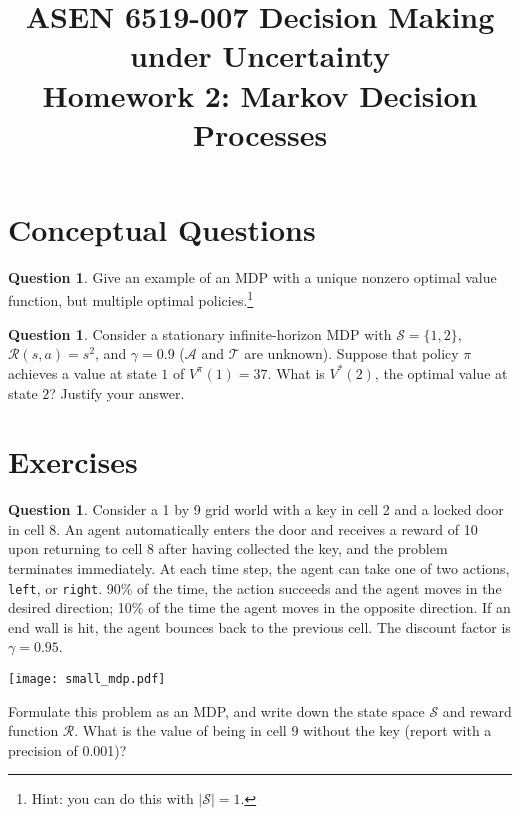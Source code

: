 \documentclass{article}
\title{ASEN 6519-007 Decision Making under Uncertainty\\
       Homework 2: Markov Decision Processes}
\theoremstyle{definition}
\newtheorem{question}[thm]{Question}
\begin{document}
\maketitle

\section{Conceptual Questions}

\begin{question}
    Give an example of an MDP with a unique nonzero optimal value function, but multiple optimal policies.\footnote{Hint: you can do this with $|\mathcal{S}| = 1$.}
\end{question}

\begin{question}
    Consider a stationary infinite-horizon MDP with $\mathcal{S} = \{1,2\}$, $\mathcal{R}(s, a) = s^2$, and $\gamma = 0.9$ ($\mathcal{A}$ and $\mathcal{T}$ are unknown). Suppose that policy $\pi$ achieves a value at state $1$ of $V^\pi(1) = 37$. What is $V^*(2)$, the optimal value at state $2$? Justify your answer.
\end{question}

\section{Exercises}

\begin{question}
    Consider a 1 by 9 grid world with a key in cell 2 and a locked door in cell 8. An agent automatically enters the door and receives a reward of 10 upon returning to cell 8 after having collected the key, and the problem terminates immediately. At each time step, the agent can take one of two actions, \texttt{left}, or \texttt{right}. 90\% of the time, the action succeeds and the agent moves in the desired direction; 10\% of the time the agent moves in the opposite direction. If an end wall is hit, the agent bounces back to the previous cell. The discount factor is $\gamma=0.95$.
\begin{center}
    \texttt{[image: small\_mdp.pdf]}
\end{center}

    Formulate this problem as an MDP, and write down the state space $\mathcal{S}$ and reward function $\mathcal{R}$. What is the value of being in cell 9 without the key (report with a precision of 0.001)?

\end{question}
\end{document}
